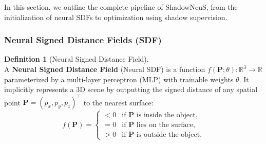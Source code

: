 \documentclass[12pt]{article}
\theoremstyle{definition}
\newtheorem{definition}{Definition}[subsection]
\begin{document}
In this section, we outline the complete pipeline of ShadowNeuS, from the initialization of neural SDFs to optimization using shadow supervision.

\subsubsection{Neural Signed Distance Fields (SDF)} \label{sec:neural_sdf}

\begin{definition}[Neural Signed Distance Field] \label{def:neural_sdf} ~\\
A \textbf{Neural Signed Distance Field} (Neural SDF) is a function $f(\mathbf{P}; \theta): \mathbb{R}^3 \to \mathbb{R}$ parameterized by a multi-layer perceptron (MLP) with trainable weights $\theta$. It implicitly represents a 3D scene by outputting the signed distance of any spatial point $\mathbf{P} = (p_x, p_y, p_z)^\top$ to the nearest surface:
\[
f(\mathbf{P}) =
\begin{cases}
< 0 & \text{if } \mathbf{P} \text{ is inside the object}, \\
= 0 & \text{if } \mathbf{P} \text{ lies on the surface}, \\
> 0 & \text{if } \mathbf{P} \text{ is outside the object}.
\end{cases}
\]
\end{definition}
\end{document}
